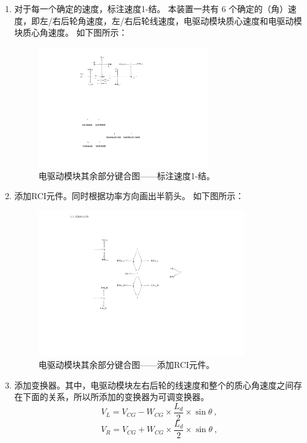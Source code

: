 \begin{enumerate}
	\item 对于每一个确定的速度，标注速度1-结。
	本装置一共有 6 个确定的（角）速度，即左/右后轮角速度，左/右后轮线速度，电驱动模块质心速度和电驱动模块质心角速度。
	如下图所示：
	\begin{figure}[!h]
		\centering
		\includegraphics[width=0.7\textwidth]{fig/4_6_bond.pdf}
		\caption{电驱动模块其余部分键合图——标注速度1-结。}\label{fig:4_6_bond}
	\end{figure}
	
	\item 添加RCI元件。同时根据功率方向画出半箭头。
	如下图所示：
	\begin{figure}[!h]
		\centering
		\includegraphics[width=0.85\textwidth]{fig/4_7_bond.pdf}
		\caption{电驱动模块其余部分键合图——添加RCI元件。}\label{fig:4_7_bond}
	\end{figure}
	
	\item 添加变换器。其中，电驱动模块左右后轮的线速度和整个的质心角速度之间存在下面的关系，所以所添加的变换器为可调变换器。
	\begin{equation}
	\label{equ:V_L}
	V_L
	=
	V_{CG}-W_{CG} \times \frac{L_d}{2} \times \sin \theta
	\ ,
	\end{equation}
	\begin{equation}
	\label{equ:V_R}
	V_R
	=
	V_{CG}+W_{CG} \times \frac{L_d}{2} \times \sin \theta
	\ ,
	\end{equation}
	

\end{enumerate}
